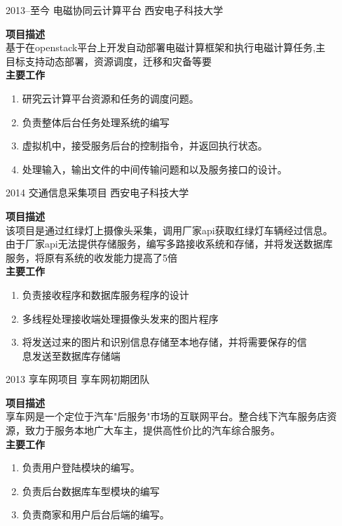\documentclass[]{friggeri-cv} %
\begin{document}
\begin{entrylist}

\entry
{2013--至今}
{电磁协同云计算平台}
{西安电子科技大学}
{\bullet  \textbf{项目描述}\\
基于在openstack平台上开发自动部署电磁计算框架和执行电磁计算任务,主\\
目标支持动态部署，资源调度，迁移和灾备等要\\
\bullet \textbf{主要工作}
\begin{enumerate}
    \item 研究云计算平台资源和任务的调度问题。
    \item 负责整体后台任务处理系统的编写
    \item 虚拟机中，接受服务后台的控制指令，并返回执行状态。
    \item 处理输入，输出文件的中间传输问题和以及服务接口的设计。
\end{enumerate}}
\entry
{2014}
{交通信息采集项目}
{西安电子科技大学}
{\bullet \textbf{项目描述}\\
该项目是通过红绿灯上摄像头采集，调用厂家api获取红绿灯车辆经过信息。\\
由于厂家api无法提供存储服务，编写多路接收系统和存储，并将发送数据库\\
服务，将原有系统的收发能力提高了5倍\\
\bullet \textbf{主要工作}
\begin{enumerate}
    \item 负责接收程序和数据库服务程序的设计
    \item 多线程处理接收端处理摄像头发来的图片程序
    \item 将发送过来的图片和识别信息存储至本地存储，并将需要保存的信\\
        息发送至数据库存储端
\end{enumerate}}

\entry
{2013}
{享车网项目}
{享车网初期团队}
{\bullet  \textbf{项目描述} \\
享车网是一个定位于汽车"后服务"市场的互联网平台。整合线下汽车服务店资\\
源，致力于服务本地广大车主，提供高性价比的汽车综合服务。\\
\bullet \textbf{主要工作}
\begin{enumerate}
    \item 负责用户登陆模块的编写。
    \item 负责后台数据库车型模块的编写
    \item 负责商家和用户后台后端的编写。
\end{enumerate}}
\end{entrylist}
\end{document}
